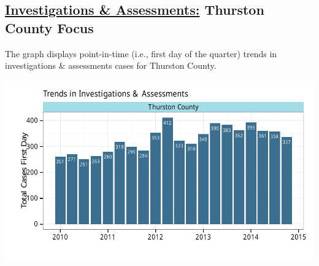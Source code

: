 \documentclass{article}\usepackage[]{graphicx}\usepackage[]{color}
\makeatletter
\def\maxwidth{ %
  \ifdim\Gin@nat@width>\linewidth
    \linewidth
  \else
    \Gin@nat@width
  \fi
}
\newenvironment{knitrout}{}{} %
\makeatother
\begin{document}
\begin{minipage}{\textwidth}
\subsection{\href{http://www.partnersforourchildren.org//data-portal/visualizations/investigations-assessments/trends}
{Investigations \& Assessments:} Thurston County Focus}
The graph displays point-in-time (i.e., first day of the quarter) trends in investigations \& assessments cases for Thurston County.   %
\begin{knitrout}
\color{fgcolor}

{\centering \includegraphics[width=\maxwidth]{figure/ia_focus-1} 

}



\end{knitrout}
\end{minipage}

\newpage
\end{document}

